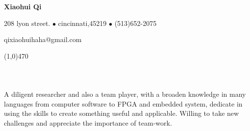 \documentclass[11pt]{article} %
\begin{document}
\centerline{{\LARGE \bf Xiaohui Qi}}
\centerline{208 lyon street. $\bullet$ cincinnati,45219 $\bullet$ (513)652-2075}
\centerline{qixiaohuihaha@gmail.com}
\noindent
\line(1,0){470}
\\
\\  %
\\
\\
\noindent 
A diligent researcher and also a team player, with a broaden knowledge in many languages from computer software to FPGA and embedded system, dedicate in using the skills to create something useful and applicable. Willing to take new challenges and appreciate the importance of team-work.
\bigskip %
\\
\\
\end{document}
